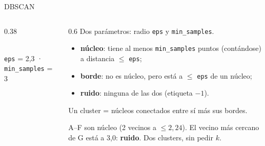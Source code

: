 \documentclass[aspectratio=169,12pt]{beamer}
\newcommand{\miniaxes}{%
  \draw[step=1,mlgray!25,very thin] (0,0) grid (9,8);
  \draw[-{Stealth},mlgray] (0,0) -- (9.3,0); \draw[-{Stealth},mlgray] (0,0) -- (0,8.3);}
\begin{document}
\begin{frame}{DBSCAN}
  \begin{columns}[c]
    \begin{column}{0.38\textwidth}
      \centering
      \\
      {\scriptsize \texttt{eps} = 2,3 · \texttt{min\_samples} = 3}
    \end{column}
    \begin{column}{0.6\textwidth}
      \small Dos parámetros: radio \texttt{eps} y \texttt{min\_samples}.
      \begin{itemize}
        \item \textbf{núcleo}: tiene al menos \texttt{min\_samples} puntos (contándose) a distancia $\leq$ \texttt{eps};
        \item \textbf{borde}: no es núcleo, pero está a $\leq$ \texttt{eps} de un núcleo;
        \item \textbf{ruido}: ninguna de las dos (etiqueta $-1$).
      \end{itemize}
      Un cluster = núcleos conectados entre sí más sus bordes.
      \begin{goldbox}
        \footnotesize A--F son núcleo (2 vecinos a $\leq 2{,}24$). El vecino más cercano de G está a 3,0: \textbf{ruido}. Dos clusters, sin pedir $k$.
      \end{goldbox}
    \end{column}
  \end{columns}
\end{frame}
\end{document}
